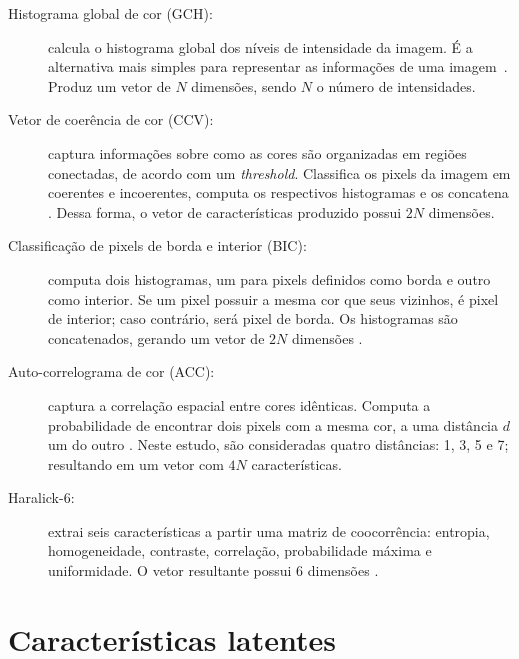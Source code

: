 \begin{description}
\item[Histograma global de cor (GCH):] calcula o histograma global dos níveis de intensidade da imagem. É a alternativa mais simples para representar as informações de uma imagem~\cite{Gonzalez2007}. Produz um vetor de $N$ dimensões, sendo $N$ o número de intensidades.

\item[Vetor de coerência de cor (CCV):] captura informações sobre como as cores são organizadas em regiões conectadas, de acordo com um \textit{threshold}. Classifica os pixels da imagem em coerentes e incoerentes, computa os respectivos histogramas e os concatena \cite{ccv}. Dessa forma, o vetor de características produzido possui $2N$ dimensões.

\item[Classificação de pixels de borda e interior (BIC):] computa dois histogramas, um para pixels definidos como borda e outro como interior. Se um pixel possuir a mesma cor que seus vizinhos, é pixel de interior; caso contrário, será pixel de borda. Os histogramas são concatenados, gerando um vetor de $2N$ dimensões \cite{bic}.

\item[Auto-correlograma de cor (ACC):] captura a correlação espacial entre cores idênticas. Computa a probabilidade de encontrar dois pixels com a mesma cor, a uma distância $d$ um do outro \cite{acc}. Neste estudo, são consideradas quatro distâncias: 1, 3, 5 e 7; resultando em um vetor com $4N$ características.

\item[Haralick-6:] extrai seis características a partir uma matriz de coocorrência: entropia, homogeneidade, contraste, correlação, probabilidade máxima e uniformidade. O vetor resultante possui 6 dimensões \cite{Haralick1973}.
\end{description}

\section{Características latentes}
\label{sec:latentes}

